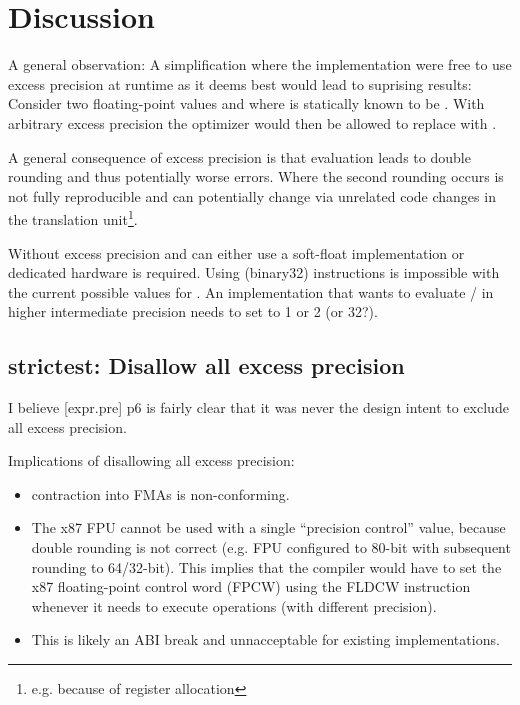 \section{Discussion}

A general observation:
A simplification where the implementation were free to use excess precision at
runtime as it deems best would lead to suprising results:
Consider two floating-point values  and  where
 is statically known to be .
With arbitrary excess precision the optimizer would then be allowed to replace
 with .

A general consequence of excess precision is that \fp evaluation leads to
double rounding and thus potentially worse errors.
Where the second rounding occurs is not fully reproducible and can potentially
change via unrelated code changes in the translation unit\footnote{e.g. because of register allocation}.

Without excess precision  and  can
either use a soft-float implementation or dedicated hardware is required.
Using \float (binary32) instructions is impossible with the current possible
values for .
An implementation that wants to evaluate \std{} /
\std{} in higher intermediate precision needs to set
 to 1 or 2 (or 32?).

\subsection{strictest: Disallow all excess precision}\label{d:1}

I believe [expr.pre] p6 is fairly clear that it was never the design intent to
exclude all excess precision.

Implications of disallowing all excess precision:
\begin{itemize}
  \item \Fp contraction into FMAs is non-conforming.

  \item The x87 FPU cannot be used with a single “precision control” value,
    because double rounding is not correct (e.g. FPU configured to 80-bit with
    subsequent rounding to 64/32-bit).
    This implies that the compiler would have to set the x87 floating-point
    control word (FPCW) using the FLDCW instruction whenever it needs to
    execute \fp operations (with different precision).

  \item This is likely an ABI break and unnacceptable for existing
    implementations.
\end{itemize}

